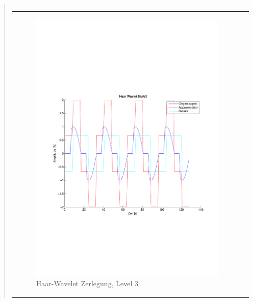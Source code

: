 \begin{quote}
\begin{center}
\begin{tabular}{ll}
                \end{tabular}
                \end{center}
                
                
                
          \begin{center}
                \begin{tabular}{ll}
    
                \hspace{-8em}
                    \begin{minipage}{0.6\textwidth}
    
                        \begin{figure}[H]
                            \label{fig:}
                            \includegraphics[scale=0.4, trim = 2cm 6cm 1cm
                            7.5cm,
                            clip]{./Bilder/Termin8/Haar_Wavlet_lvl_3}
                            \caption{Haar-Wavelet Zerlegung, Level 3}
                        \end{figure}
    

\end{minipage}
\end{tabular}
\end{center}
\end{quote}
